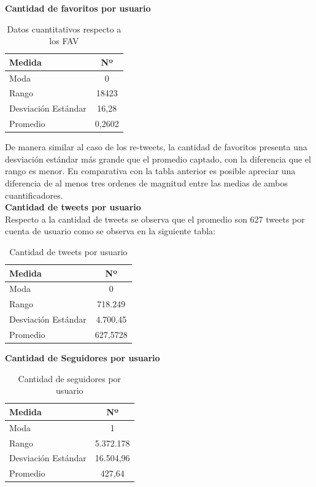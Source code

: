 \textbf{Cantidad de favoritos por usuario} \\

\begin{table}[H]
	\centering
	\begin{tabular}{| l | c |}
		\hline
		Medida   				& Nº\\ \hline 
		Moda    				& 0 \\ \hline
		Rango    				& 18423 \\ \hline
		Desviación Estándar    	& 16,28 \\ \hline
		Promedio   				& 0,2602 \\ \hline
	\end{tabular}
	\caption {Datos cuantitativos respecto a los FAV}
\end{table}

De manera similar al caso de los re-tweets, la cantidad de favoritos presenta una desviación estándar más grande que el promedio captado, con la diferencia que el rango es menor. En comparativa con la tabla anterior es posible apreciar una diferencia de al menos tres ordenes de magnitud entre las medias de ambos cuantificadores.\\

\textbf{Cantidad de tweets por usuario} \\

Respecto a la cantidad de tweets se observa que el promedio son 627 tweets por cuenta de usuario como se observa en la siguiente tabla: 

\begin{table}[H]
	\centering
	\begin{tabular}{| l | c |}
		\hline
		Medida   				& Nº\\ \hline 
		Moda    				& 0 \\ \hline
		Rango    				& 718.249 \\ \hline
		Desviación Estándar    	& 4.700,45\\ \hline
		Promedio   				& 627,5728 \\ \hline
	\end{tabular}
	\caption {Cantidad de tweets por usuario}
	\label{resumen_tweets}
\end{table}
\textbf{Cantidad de Seguidores por usuario} \\

\begin{table}[H]
	\centering
	\begin{tabular}{| l | c |}
		\hline
		Medida   				& Nº\\ \hline 
		Moda    				&  1 \\ \hline
		Rango    				& 5.372.178\\ \hline
		Desviación Estándar    	& 16.504,96 \\ \hline
		Promedio   				& 427,64 \\ \hline
	\end{tabular}
	\caption {Cantidad de seguidores por usuario}
	\label{table:followers_por_usuario}
\end{table}

